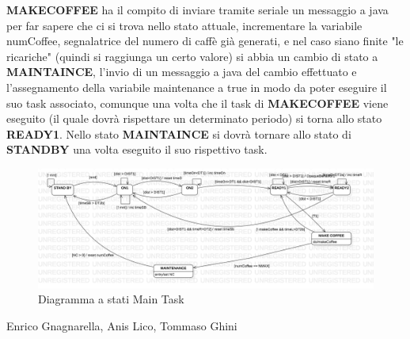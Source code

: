 \documentclass[a4paper]{article}
\begin{document}
\begin{itemize}
\textbf{MAKECOFFEE} ha il compito di inviare tramite seriale un messaggio a java per far sapere che ci si trova nello stato attuale, incrementare la variabile numCoffee, segnalatrice del numero di caffè già generati, e nel caso siano finite "le ricariche" (quindi si raggiunga un certo valore) si abbia un cambio di stato a \textbf{MAINTAINCE}, l'invio di un messaggio a java del cambio effettuato e l'assegnamento della variabile maintenance a true in modo da poter eseguire il suo task associato, comunque una volta che il task di \textbf{MAKECOFFEE} viene eseguito (il quale dovrà rispettare un determinato periodo) si torna allo stato \textbf{READY1}.
Nello stato \textbf{MAINTAINCE} si dovrà tornare allo stato di \textbf{STANDBY} una volta eseguito il suo rispettivo task.

\begin{figure}[h!]
	\includegraphics[scale = 0.30]{MainTask.png}
	\caption{Diagramma a stati Main Task}
\end{figure}
\end{itemize}

\null
\vfill
Enrico Gnagnarella, Anis Lico, Tommaso Ghini
\clearpage
\end{document}
